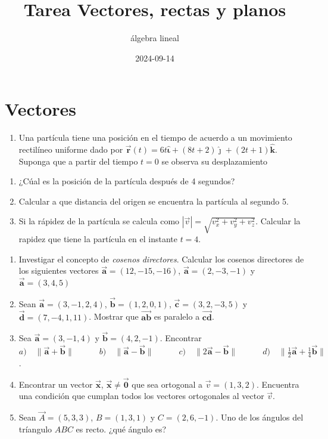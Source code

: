 \documentclass[
]{article}
\title{Tarea Vectores, rectas y planos}
\author{álgebra lineal}
\date{2024-09-14}
\providecommand{\tightlist}{%
  \setlength{\itemsep}{0pt}\setlength{\parskip}{0pt}}
\begin{document}
\maketitle

\hypertarget{vectores}{%
\section{Vectores}\label{vectores}}

\begin{enumerate}
\def\labelenumi{\arabic{enumi}.}
\tightlist
\item
  Una partícula tiene una posición en el tiempo de acuerdo a un
  movimiento rectilíneo uniforme dado por
  \(\vec{\mathbf{r}}(t) = 6t\hat{\mathbf{\iota}} + (8t+2)\hat{\mathbf{\jmath}}+(2t+1)\hat{\mathbf{k}}\).
  Suponga que a partir del tiempo \(t=0\) se observa su desplazamiento
\end{enumerate}

\begin{enumerate}
\def\labelenumi{\alph{enumi})}
\item
  ¿Cúal es la posición de la partícula después de 4 segundos?
\item
  Calcular a que distancia del origen se encuentra la partícula al
  segundo 5.
\item
  Si la rápidez de la partícula se calcula como
  \(|\vec{v}|=\sqrt{v_x^2+v_y^{2}+v_z^{2}}\). Calcular la rapidez que
  tiene la partícula en el instante \(t=4\).
\end{enumerate}

\begin{enumerate}
\def\labelenumi{\arabic{enumi}.}
\item
  Investigar el concepto de \emph{cosenos} \emph{directores}. Calcular
  los cosenos directores de los siguientes vectores
  \(\vec{\mathbf{a}}=(12,-15,-16)\), \(\vec{\mathbf{a}} = (2,-3,-1)\) y
  \(\vec{\mathbf{a}} = (3, 4, 5)\)
\item
  Sean \(\vec{\mathbf{a}}=(3,-1,2,4)\), \(\vec{\mathbf{b}}=(1,2,0,1)\),
  \(\vec{\mathbf{c}}=(3,2,-3,5)\) y \(\vec{\mathbf{d}}=(7,-4,1,11)\).
  Mostrar que \(\vec{\mathbf{ab}}\) es paralelo a \(\vec{\mathbf{cd}}\).
\item
  Sea \(\vec{\mathbf{a}}=(3,-1,4)\) y \(\vec{\mathbf{b}}=(4,2,-1)\).
  Encontrar
  \(a)\quad\|\vec{\mathbf{a}} + \vec{\mathbf{b}}\|\quad\quad\quad b)\quad \|\vec{\mathbf{a}} - \vec{\mathbf{b}}\|\quad\quad\quad c)\quad \|2\vec{\mathbf{a}}-\vec{\mathbf{b}}\|\quad\quad\quad d)\quad \|\frac{1}{2}\vec{\mathbf{a}}+\frac{1}{4}\vec{\mathbf{b}}\|\).
\item
  Encontrar un vector \(\vec{\mathbf{x}}\),
  \(\vec{\mathbf{x}}\ne \vec{\mathbf{0}}\) que sea ortogonal a
  \(\vec{v}=(1,3,2)\). Encuentra una condición que cumplan todos los
  vectores ortogonales al vector \(\vec{v}\).
\item
  Sean \(\vec{A}=(5,3,3)\), \(B=(1,3,1)\) y \(C=(2,6,-1)\). Uno de los
  ángulos del tríangulo \(ABC\) es recto. ¿qué ángulo es?
\end{enumerate}
\end{document}
